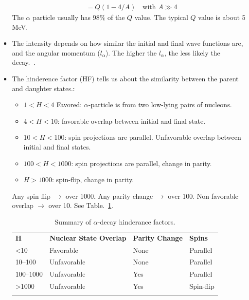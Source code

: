 \documentclass[letter]{article}
\begin{document}
\begin{itemize}
\begin{equation*}
\begin{split}
    &=Q(1-4/A) \quad \text{with } A \gg 4
  \end{split}
\end{equation*}
The $\alpha$ particle usually has 98\% of the $Q$ value. The typical
$Q$ value is about 5 MeV.~\cite[pp. 248]{krane}
\item The intensity depends on how similar the initial and final wave
  functions are, and the angular momentum ($l_{\alpha}$). The higher
  the $l_{\alpha}$, the less likely the decay.~\cite[pp. 257-258]{krane}.
\item The hinderence factor (HF) tells us about the similarity between
  the parent and daughter states.:
  \begin{itemize}
  \item $1<H<4$ Favored: $\alpha$-particle is from two low-lying pairs
    of nucleons.
  \item $4<H<10$: favorable overlap between initial and final state.
  \item $10<H<100$: spin projections are parallel. Unfavorable overlap
    between initial and final states.
  \item $100<H<1000$: spin projections are parallel, change in parity.
  \item $H>1000$: spin-flip, change in parity.
  \end{itemize}
Any spin flip $\to$ over 1000. Any parity change $\to$ over
100. Non-favorable overlap $\to$ over 10. See
Table.~\ref{tab:alpha-hinderance}.~\cite[Lec. 18]{lecture}
\begin{table}[hbt]
\centering
\begin{tabular}{llll}
\textbf{H}       & \textbf{Nuclear State Overlap} & \textbf{Parity Change} & \textbf{Spins} \\
\textless10   & Favorable                      & None                   & Parallel       \\
10--100           & Unfavorable                    & None                   & Parallel       \\
100--1000         & Unfavorable                    & Yes                    & Parallel       \\
\textgreater1000 & Unfavorable                    & Yes                    & Spin-flip      \\
                 &                                &                        &               
\end{tabular}
\caption{Summary of $\alpha$-decay hinderance factors.}
\label{tab:alpha-hinderance}
\end{table}

\end{itemize}
\end{document}
